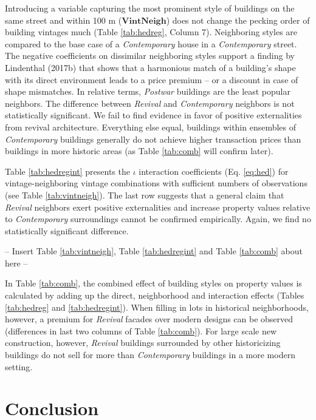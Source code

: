 \documentclass[]{article}
\begin{document}
Introducing a variable capturing the most prominent style of buildings
on the same street and within 100 m (\(\mathbf{VintNeigh}\)) does not
change the pecking order of building vintages much (Table
\ref{tab:hedreg}, Column 7). Neighboring styles are compared to the base
case of a \emph{Contemporary} house in a \emph{Contemporary} street. The
negative coefficients on dissimilar neighboring styles support a finding
by Lindenthal (2017b) that shows that a harmonious match of a building's
shape with its direct environment leads to a price premium -- or a
discount in case of shape mismatches. In relative terms, \emph{Postwar}
buildings are the least popular neighbors. The difference between
\emph{Revival} and \emph{Contemporary} neighbors is not statistically
significant. We fail to find evidence in favor of positive externalities
from revival architecture. Everything else equal, buildings within
ensembles of \emph{Contemporary} buildings generally do not achieve
higher transaction prices than buildings in more historic areas (as
Table \ref{tab:comb} will confirm later).

Table \ref{tab:hedregint} presents the \(\iota\) interaction
coefficients (Eq. \ref{eq:hed}) for vintage-neighboring vintage
combinations with sufficient numbers of observations (see Table
\ref{tab:vintneigh}). The last row suggests that a general claim that
\emph{Revival} neighbors exert positive externalities and increase
property values relative to \emph{Contemporary} surroundings cannot be
confirmed empirically. Again, we find no statistically significant
difference.

\begin{center}
  -- Insert  Table \ref{tab:vintneigh}, Table \ref{tab:hedregint} and Table \ref{tab:comb} about here --
\end{center}

In Table \ref{tab:comb}, the combined effect of building styles on
property values is calculated by adding up the direct, neighborhood and
interaction effects (Tables \ref{tab:hedreg} and \ref{tab:hedregint}).
When filling in lots in historical neighborhoods, however, a premium for
\emph{Revival} facades over modern designs can be observed (differences
in last two columns of Table \ref{tab:comb}). For large scale new
construction, however, \emph{Revival} buildings surrounded by other
historicizing buildings do not sell for more than \emph{Contemporary}
buildings in a more modern setting.

\hypertarget{conclusion}{%
\section{Conclusion}\label{conclusion}}
\end{document}
